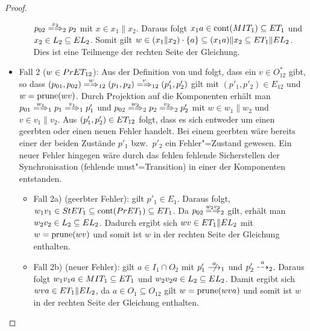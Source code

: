 \begin{proof}
\begin{itemize}
\begin{itemize}
        $p_{02}\weakmay[x_2]_2 p_2$ mit $x\in x_1\|x_2$. Daraus folgt $x_1a\in
        \mathrm{cont} (MIT _1) \subseteq ET _1$ und $x_2\in L_2\subseteq EL _2$.
        Somit gilt $w\in (x_1\|x_2) \cdot \{a\} \subseteq (x_1a)\|x_2\subseteq
        ET _1\|EL _2$. Dies ist eine Teilmenge der rechten Seite der Gleichung.
    \end{itemize}
  \item Fall 2 ($w\in PrET _{12}$): Aus der Definition von \PrET{} und \prune{}
    folgt, dass ein $v\in O_{12}^*$ gibt, so dass $(p_{01},p_{02})
      \weakmay[w]_{12} (p_1,p_2) \weakmay[v]_{12} (p'_1,p'_2)$ gilt mit
      $(p'_1,p'_2)\in E_{12}$ und $w=\mathrm{prune} (wv)$. Durch Projektion auf die
      Komponenten erhält man $p_{01} \weakmay[w_1]_1 p_1 \weakmay[v_1]_1 p'_1$
      und $p_{02} \weakmay[w_2]_2 p_2 \weakmay[v_2]_2 p'_2$ mit $w\in w_1\|w_2$
      und $v\in v_1\|v_2$. Aus $(p'_1,p'_2)\in ET _{12}$ folgt, dass es sich
      entweder um einen geerbten oder einen neuen Fehler handelt. Bei einem
      geerbten wäre bereits einer der beiden Zustände $p'_1$ bzw.\ $p'_2$ ein
      Fehler"=Zustand gewesen. Ein neuer Fehler hingegen wäre
      durch das fehlen fehlende Sicherstellen der Synchronisation (fehlende
      must"=Transition) in einer der Komponenten entstanden.
    \begin{itemize}
      \item Fall 2a) (geerbter Fehler): \OBdA{} gilt $p'_1\in E_1$. Daraus
        folgt, $w_1v_1\in StET_1 \subseteq \mathrm{cont} (PrET _1) \subseteq ET _1$.
        Da $p_{02} \weakmay[w_2v_2]_2$ gilt, erhält man $w_2v_2\in L_2\subseteq
        EL _2$. Dadurch ergibt sich $wv\in ET _1\|EL _2$ mit $w=\mathrm{prune} (wv)$
        und somit ist $w$ in der rechten Seite der Gleichung enthalten.
      \item Fall 2b) (neuer Fehler): \OBdA{} gilt $a\in I_1\cap O_2$ mit
        $p'_1\nmust[a]_1$ und $p'_2\may[a]_2$. Daraus folgt $w_1v_1a\in MIT _1
        \subseteq ET _1$ und $w_2v_2a\in L_2 \subseteq EL _2$. Damit ergibt
        sich $wva\in ET _1\|EL_2$, da $a\in O_1\subseteq O_{12}$ gilt
        $w=\mathrm{prune} (wva)$ und somit ist $w$ in der rechten Seite der Gleichung
        enthalten.
    \end{itemize}
  \end{itemize}


\end{proof}
